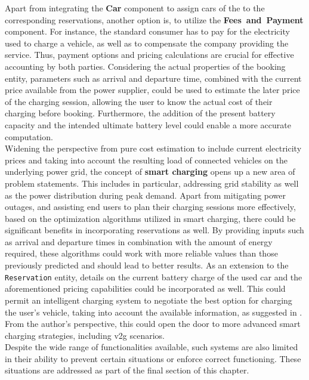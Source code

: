 Apart from integrating the \textbf{Car} component to assign cars of the  to the corresponding reservations, another option is, to utilize the \textbf{Fees~and~Payment} component.
For instance, the standard consumer has to pay for the electricity used to charge a vehicle, as well as to compensate the company providing the service. Thus, payment options and pricing calculations are crucial for effective accounting by both parties. 
Considering the actual properties of the booking entity, parameters such as arrival and departure time, combined with the current price available from the power supplier, could be used to estimate the later price of the charging session, allowing the user to know the actual cost of their charging before booking.
Furthermore, the addition of the present battery capacity and the intended ultimate battery level could enable a more accurate computation. \\
Widening the perspective from pure cost estimation to include current electricity prices and taking into account the resulting load of connected vehicles on the underlying power grid, the concept of \textbf{smart charging} opens up a new area of problem statements. This includes in particular, addressing grid stability as well as the power distribution during peak demand.
Apart from mitigating power outages, and assisting end users to plan their charging sessions more effectively, based on the optimization algorithms utilized in smart charging, there could be significant benefits in incorporating reservations as well.
By providing inputs such as arrival and departure times in combination with the amount of energy required, these algorithms could work with more reliable values than those previously predicted and should lead to better results.
As an extension to the \texttt{Reservation} entity, details on the current battery charge of the used car and the aforementioned pricing capabilities could be incorporated as well. 
This could permit an intelligent charging system to negotiate the best option for charging the user's vehicle, taking into account the available information, as suggested in \cite{orcioni_ev_2020}.
From the author's perspective, this could open the door to more advanced smart charging strategies, including \acrshort{v2g} scenarios. \\

\noindent Despite the wide range of functionalities available, such systems are also limited in their ability to prevent certain situations or enforce correct functioning. These situations are addressed as part of the final section of this chapter.

